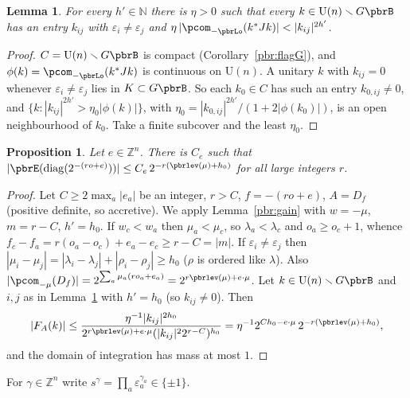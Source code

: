 \documentclass[10pt]{amsart}
\newtheorem{proposition}[theorem]{Proposition}
\newtheorem{lemma}[theorem]{Lemma}
\theoremstyle{definition}
\theoremstyle{remark}
\newcommand{\N}{\mathbb N}
\newcommand{\Z}{\mathbb Z}
\providecommand{\auU}{\mathrm U}
\begin{document}
\begin{lemma}\label{pbr:compact}
For every $h'\in\N$ there is $\eta>0$ such that every $k\in\auU(n)\smallsetminus G\pbrB$ has an entry
$k_{ij}$ with $\varepsilon_i\ne\varepsilon_j$ and $\eta\,|\pcom_{-\pbrLo}(k^*Jk)|<|k_{ij}|^{2h'}$.
\end{lemma}
\begin{proof}
$C=\auU(n)\smallsetminus G\pbrB$ is compact (Corollary~\ref{pbr:flagG}), and $\phi(k)=\pcom_{-\pbrLo}
(k^*Jk)$ is continuous on $\auU(n)$. A unitary $k$ with $k_{ij}=0$ whenever $\varepsilon_i\ne
\varepsilon_j$ lies in $K\subset G\pbrB$. So each $k_0\in C$ has such an entry $k_{0,ij}\ne0$, and
$\{k:|k_{ij}|^{2h'}>\eta_0|\phi(k)|\}$, with $\eta_0=|k_{0,ij}|^{2h'}/(1+2|\phi(k_0)|)$, is an open
neighbourhood of $k_0$. Take a finite subcover and the least $\eta_0$.
\end{proof}

\begin{proposition}\label{pbr:Ebound}
Let $e\in\Z^n$. There is $C_e$ such that $|\pbrE(\operatorname{diag}(2^{-(ro+e)}))|\le C_e\,2^{-r(
\pbrlev(\mu)+h_0)}$ for all large integers $r$.
\end{proposition}
\begin{proof}
Let $C\ge2\max_a|e_a|$ be an integer, $r>C$, $f=-(ro+e)$, $A=D_f$ (positive definite, so accretive).
We apply Lemma~\ref{pbr:gain} with $w=-\mu$, $m=r-C$, $h'=h_0$. If $w_c<w_a$ then $\mu_a<\mu_c$, so
$\lambda_a<\lambda_c$ and $o_a\ge o_c+1$, whence $f_c-f_a=r(o_a-o_c)+e_a-e_c\ge r-C=|m|$. If
$\varepsilon_i\ne\varepsilon_j$ then $|\mu_i-\mu_j|=|\lambda_i-\lambda_j|+|\rho_i-\rho_j|\ge h_0$ ($\rho$
is ordered like $\lambda$). Also $|\pcom_{-\mu}(D_f)|=2^{\sum_a\mu_a(ro_a+e_a)}=2^{r\pbrlev(\mu)+e\cdot
\mu}$. Let $k\in\auU(n)\smallsetminus G\pbrB$ and $i,j$ as in Lemma~\ref{pbr:compact} with $h'=h_0$
(so $k_{ij}\ne0$). Then
\[
|F_A(k)|\le\frac{\eta^{-1}|k_{ij}|^{2h_0}}{2^{r\pbrlev(\mu)+e\cdot\mu}(|k_{ij}|^22^{r-C})^{h_0}}=
\eta^{-1}2^{Ch_0-e\cdot\mu}\,2^{-r(\pbrlev(\mu)+h_0)},
\]
and the domain of integration has mass at most $1$.
\end{proof}

For $\gamma\in\Z^n$ write $s^\gamma=\prod_a\varepsilon_a^{\gamma_a}\in\{\pm1\}$.
\end{document}
